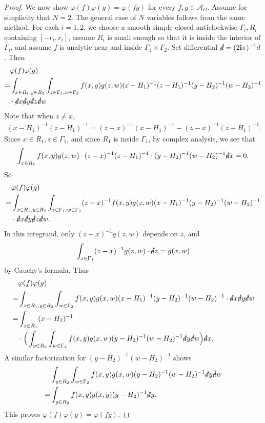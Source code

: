 \documentclass[12pt,b5paper,notitlepage]{article}
\theoremstyle{definition}
\theoremstyle{plain}
\newcommand{\mc}{\mathcal}
\newcommand{\di}{\slashed d}
\newcommand{\im}{\mathbf{i}}
\numberwithin{equation}{section}
\begin{document}
\begin{proof}
We now show $\varphi(f)\varphi(g)=\varphi(fg)$ for every $f,g\in \mc A_O$. Assume for simplicity that $N=2$. The general case of $N$ variables follows from the same method. For each $i=1,2$, we choose a smooth simple closed anticlockwise $\Gamma_i,R_i$ containing $[-r_i,r_i]$,  assume $R_i$ is small enough so that it is inside the interior of $\Gamma_i$, and assume $f$ is analytic near and inside $\Gamma_1\times \Gamma_2$. Set differential $\di=(2\im\pi)^{-1}d$. Then
\begin{align*}
&\varphi(f)\varphi(g)\\
=&\int_{x\in R_1,y\in R_2}\int_{z\in\Gamma_1,w\in \Gamma_2}f(x,y)g(z,w)(x-H_1)^{-1}(z-H_1)^{-1}(y-H_2)^{-1}(w-H_2)^{-1}\\
&\cdot\di x\di y \di z \di w
\end{align*}
Note that when $z\neq x$,
\begin{align*}
(x-H_1)^{-1}(z-H_1)^{-1}=(z-x)^{-1}(x-H_1)^{-1}-(z-x)^{-1}(z-H_1)^{-1}.
\end{align*}
Since $x\in R_1,z\in\Gamma_1$, and since $R_1$ is inside $\Gamma_1$, by complex analysis, we see that 
\begin{align*}
\int_{x\in R_1}f(x,y)g(z,w)\cdot (z-x)^{-1}(z-H_1)^{-1}\cdot (y-H_2)^{-1}(w-H_2)^{-1}\di x=0.
\end{align*}
So
\begin{align*}
&\varphi(f)\varphi(g)\\
=&\int_{x\in R_1,y\in R_2}\int_{z\in\Gamma_1,w\in \Gamma_2}(z-x)^{-1}f(x,y)g(z,w)(x-H_1)^{-1}(y-H_2)^{-1}(w-H_2)^{-1}\\
&\cdot \di x\di y \di z \di w.
\end{align*}
In this integrand, only $(z-x)^{-1}g(z,w)$ depends on $z$, and
\begin{align*}
\int_{z\in\Gamma_1}	(z-x)^{-1}g(z,w)\cdot \di z= g(x,w) 
\end{align*}
by Cauchy's formula. Thus
\begin{align*}
&\varphi(f)\varphi(g)\\
=&\int_{x\in R_1,y\in R_2}\int_{w\in \Gamma_2}f(x,y)g(x,w)(x-H_1)^{-1}(y-H_2)^{-1}(w-H_2)^{-1}\cdot \di x\di y \di w\\
=&\int_{x\in R_1}(x-H_1)^{-1}\\
&\cdot\Big(\int_{y\in R_2}\int_{w\in\Gamma_2}f(x,y)g(x,w)(y-H_2)^{-1}(w-H_2)^{-1} \di y\di w\Big)\di x.
\end{align*}
A similar factorization for $(y-H_2)^{-1}(w-H_2)^{-1}$ shows
\begin{align*}
&\int_{y\in R_2}\int_{w\in\Gamma_2}f(x,y)g(x,w)(y-H_2)^{-1}(w-H_2)^{-1} \di y\di w\\
=&\int_{y\in R_2}f(x,y)g(x,y)(y-H_2)^{-1}\di y.
\end{align*}
This proves $\varphi(f)\varphi(g)=\varphi(fg)$. 



\end{proof}
\end{document}
